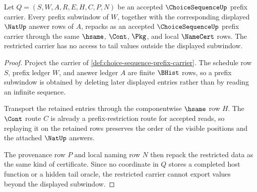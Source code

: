 \begin{theorem}
\label{thm:choice-sequence-prefix-stability}
Let $Q=(S,W,A,R,E,H,C,P,N)$ be an accepted $\ChoiceSequenceUp$ prefix carrier. Every prefix subwindow of $W$, together with the corresponding displayed $\NatUp$ answer rows of $A$, repacks as an accepted $\ChoiceSequenceUp$ prefix carrier through the same $\hsame$, $\Cont$, $\Pkg$, and local $\NameCert$ rows. The restricted carrier has no access to tail values outside the displayed subwindow.
\end{theorem}
\begin{proof}
Project the carrier of \autoref{def:choice-sequence-prefix-carrier}. The schedule row $S$, prefix ledger $W$, and answer ledger $A$ are finite $\BHist$ rows, so a prefix subwindow is obtained by deleting later displayed entries rather than by reading an infinite sequence.

Transport the retained entries through the componentwise $\hsame$ row $H$. The $\Cont$ route $C$ is already a prefix-restriction route for accepted reads, so replaying it on the retained rows preserves the order of the visible positions and the attached $\NatUp$ answers.

The provenance row $P$ and local naming row $N$ then repack the restricted data as the same kind of certificate. Since no coordinate in $Q$ stores a completed host function or a hidden tail oracle, the restricted carrier cannot export values beyond the displayed subwindow.
\end{proof}

